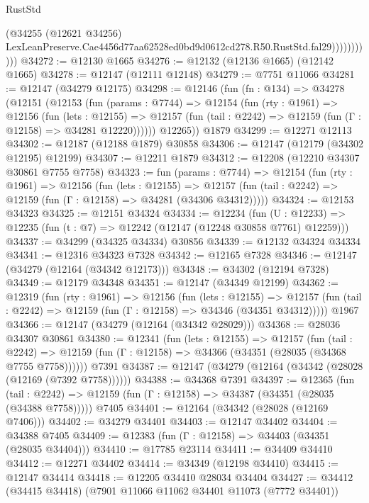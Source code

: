 \begin{lexlean}{RustStd}
\begin{coremodule}
                        (@34255
                          (@12621 @34256)
                          LexLeanPreserve.Cae4456d77aa62528ed0bd9d0612cd278.R50.RustStd.fal29)))))))))))
@34272 := @12130 @1665
@34276 := @12132 (@12136 @1665) (@12142 @1665)
@34278 := @12147 (@12111 @12148)
@34279 := @7751 @11066
@34281 := @12147 (@34279 @12175)
@34298 := @12146
    (fun (fn : @134) =>
    @34278
      (@12151
        (@12153
          (fun (params : @7744) =>
          @12154
            (fun (rty : @1961) =>
            @12156
              (fun (lets : @12155) =>
              @12157 (fun (tail : @2242) => @12159 (fun (Γ : @12158) => @34281 @12220))))))
        @12265))
    @1879
@34299 := @12271 @12113
@34302 := @12187 (@12188 @1879) @30858
@34306 := @12147 (@12179 (@34302 @12195) @12199)
@34307 := @12211 @1879
@34312 := @12208 (@12210 @34307 @30861 @7755 @7758)
@34323 := fun (params : @7744) =>
  @12154
    (fun (rty : @1961) =>
    @12156
      (fun (lets : @12155) =>
      @12157 (fun (tail : @2242) => @12159 (fun (Γ : @12158) => @34281 (@34306 @34312)))))
@34324 := @12153 @34323
@34325 := @12151 @34324
@34334 := @12234
    (fun (U : @12233) => @12235 (fun (t : @7) => @12242 (@12147 (@12248 @30858 @7761) @12259)))
@34337 := @34299 (@34325 @34334) @30856
@34339 := @12132 @34324 @34334
@34341 := @12316 @34323 @7328
@34342 := @12165 @7328
@34346 := @12147 (@34279 (@12164 (@34342 @12173)))
@34348 := @34302 (@12194 @7328)
@34349 := @12179 @34348
@34351 := @12147 (@34349 @12199)
@34362 := @12319
    (fun (rty : @1961) =>
    @12156
      (fun (lets : @12155) =>
      @12157 (fun (tail : @2242) => @12159 (fun (Γ : @12158) => @34346 (@34351 @34312)))))
    @1967
@34366 := @12147 (@34279 (@12164 (@34342 @28029)))
@34368 := @28036 @34307 @30861
@34380 := @12341
    (fun (lets : @12155) =>
    @12157
      (fun (tail : @2242) =>
      @12159 (fun (Γ : @12158) => @34366 (@34351 (@28035 (@34368 @7755 @7758))))))
    @7391
@34387 := @12147 (@34279 (@12164 (@34342 (@28028 (@12169 (@7392 @7758))))))
@34388 := @34368 @7391
@34397 := @12365
    (fun (tail : @2242) => @12159 (fun (Γ : @12158) => @34387 (@34351 (@28035 (@34388 @7758)))))
    @7405
@34401 := @12164 (@34342 (@28028 (@12169 @7406)))
@34402 := @34279 @34401
@34403 := @12147 @34402
@34404 := @34388 @7405
@34409 := @12383 (fun (Γ : @12158) => @34403 (@34351 (@28035 @34404)))
@34410 := @17785 @23114
@34411 := @34409 @34410
@34412 := @12271 @34402
@34414 := @34349 (@12198 @34410)
@34415 := @12147 @34414
@34418 := @12205 @34410 @28034 @34404
@34427 := @34412 (@34415 @34418) (@7901 @11066 @11062 @34401 @11073 (@7772 @34401))

\end{coremodule}
\end{lexlean}
